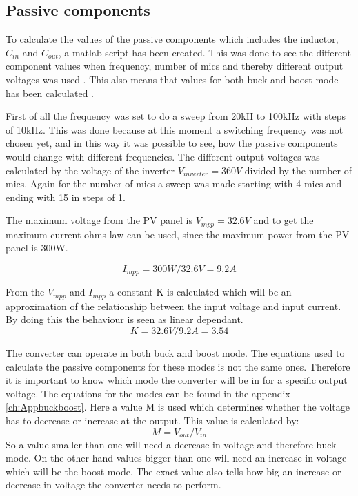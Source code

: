 \subsection{Passive components}  \label{passives}

To calculate the values of the passive components which includes the inductor, $C_{in}$ and $C_{out}$, a matlab  script has been created. This was done to see the different component values when frequency, number of mics and thereby different output voltages was used . This also means that values for both buck and boost mode has been calculated .

First of all the frequency was set to do a sweep from 20kH to 100kHz with steps of 10kHz. This was done because at this moment a switching frequency was not chosen yet, and in this way it was possible to see, how the passive components would change with different frequencies. 
The different output voltages was calculated by the voltage of the inverter $V_{inverter}=360V$ divided by the number of mics. Again for the number of mics a sweep was made starting with 4 mics and ending with 15 in steps of 1.

The maximum voltage from the PV panel is $V_{mpp}=32.6V$ 
and to get the maximum current ohms law can be used, since the maximum power from the PV panel is 300W.

\begin{equation}
I_{mpp} = 300W/32.6V = 9.2A
\end{equation} 

From the $V_{mpp}$ and $I_{mpp}$ a constant K is calculated which will be an approximation of the relationship between the input voltage and input current.
By doing this the behaviour is seen as linear dependant.
\begin{equation}
 K = 32.6V/9.2A = 3.54
 \end{equation} 

The converter can operate in both buck and boost mode. The equations used to calculate the passive components for these modes is not the same ones. Therefore it is important to know which mode the converter will be in for a specific output voltage.  
The equations for the modes can be found in the appendix \ref{ch:Appbuckboost}. Here a value M is used which determines whether the voltage has to decrease or increase at the output. This value is calculated by:
\begin{equation}
M = V_{out}/V_{in}
\end{equation}
So a value smaller than one will need a decrease in voltage and therefore buck mode. On the other hand values bigger than one will need an increase in voltage which will be the boost mode. The exact value also tells how big an increase or decrease in voltage the converter needs to perform. 

